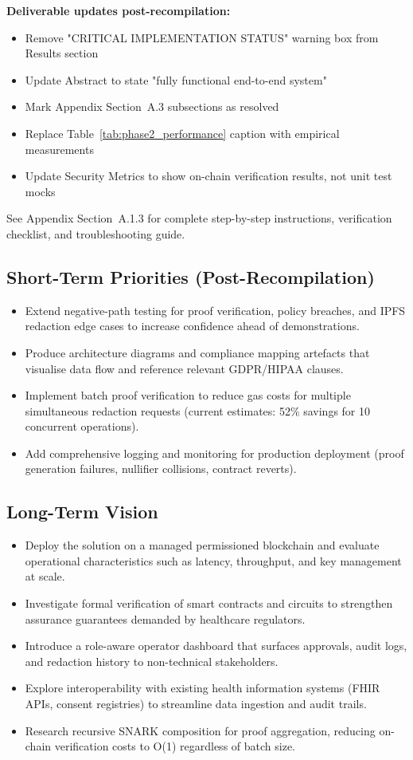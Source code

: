 \textbf{Deliverable updates post-recompilation:}
\begin{itemize}
    \item Remove "CRITICAL IMPLEMENTATION STATUS" warning box from Results section
    \item Update Abstract to state "fully functional end-to-end system"
    \item Mark Appendix Section~A.3 subsections as resolved
    \item Replace Table~\ref{tab:phase2_performance} caption with empirical measurements
    \item Update Security Metrics to show on-chain verification results, not unit test mocks
\end{itemize}

See Appendix Section~A.1.3 for complete step-by-step instructions, verification checklist, and troubleshooting guide.

\subsection{Short-Term Priorities (Post-Recompilation)}
\begin{itemize}
    \item Extend negative-path testing for proof verification, policy breaches, and IPFS redaction edge cases to increase confidence ahead of demonstrations.
    \item Produce architecture diagrams and compliance mapping artefacts that visualise data flow and reference relevant GDPR/HIPAA clauses.
    \item Implement batch proof verification to reduce gas costs for multiple simultaneous redaction requests (current estimates: 52\% savings for 10 concurrent operations).
    \item Add comprehensive logging and monitoring for production deployment (proof generation failures, nullifier collisions, contract reverts).
\end{itemize}

\subsection{Long-Term Vision}
\begin{itemize}
    \item Deploy the solution on a managed permissioned blockchain and evaluate operational characteristics such as latency, throughput, and key management at scale.
    \item Investigate formal verification of smart contracts and circuits to strengthen assurance guarantees demanded by healthcare regulators.
    \item Introduce a role-aware operator dashboard that surfaces approvals, audit logs, and redaction history to non-technical stakeholders.
    \item Explore interoperability with existing health information systems (FHIR APIs, consent registries) to streamline data ingestion and audit trails.
    \item Research recursive SNARK composition for proof aggregation, reducing on-chain verification costs to O(1) regardless of batch size.
\end{itemize}
